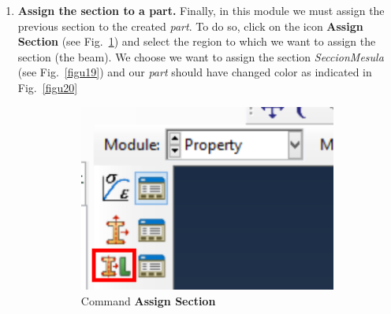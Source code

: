 \begin{enumerate}
\item \textbf{Assign the section to a part.}  Finally, in this module
  we must assign the previous section to the created \textit{part}. To
  do so, click on the icon \textbf{Assign Section} (see
  Fig.~\ref{figu21}) and select the region to which we want to assign
  the section (the beam). We choose  we want to assign the section
  \textit{SeccionMesula} (see Fig.~\ref{figu19}) and our \textit{part}
  should have changed color as indicated in Fig.~\ref{figu20}
  \begin{figure}[H]
    \centering
    \begin{subfigure}{0.19\textwidth}
      \includegraphics[width=\textwidth]{./body/images/imagen21.pdf}
      \caption{Command \textbf{Assign Section}}
      \label{figu21}
    \end{subfigure}%
    ~ %
    \begin{subfigure}{0.29\textwidth}

\end{subfigure}
\end{figure}
\end{enumerate}
